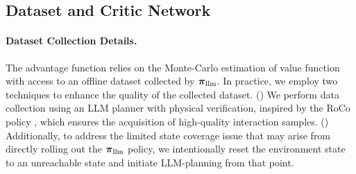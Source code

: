 \documentclass[11pt]{article}
\theoremstyle{plain}
\theoremstyle{remark}
\begin{document}
% 

\clearpage
\subsection{Dataset and Critic Network}\label{app:ablation}
\paragraph{Dataset Collection Details.} 
The advantage function relies on the Monte-Carlo estimation of value function with access to an offline dataset collected by $\boldsymbol{\pi}_{\rm llm}$. In practice, we employ two techniques to enhance the quality of the collected dataset. () We perform data collection using an LLM planner with physical verification, inspired by the RoCo policy \citep{mandi2023roco}, which ensures the acquisition of high-quality interaction samples. () Additionally, to address the limited state coverage issue that may arise from directly rolling out the $\boldsymbol{\pi}_{\rm llm}$ policy, we intentionally reset the environment state to an unreachable state and initiate LLM-planning from that point. 
\end{document}
